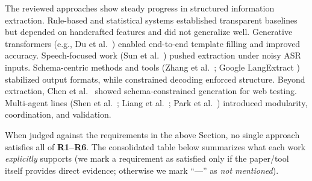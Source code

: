 The reviewed approaches show steady progress in structured information extraction. Rule-based and statistical systems established transparent baselines but depended on handcrafted features and did not generalize well. Generative transformers (e.g., Du et al.\ \cite{du2021template}) enabled end-to-end template filling and improved accuracy. Speech-focused work (Sun et al.\ \cite{sun2023slot}) pushed extraction under noisy ASR inputs. Schema-centric methods and tools (Zhang et al.\ \cite{zhang2023sgptod}; Google LangExtract \cite{google2024langextract}) stabilized output formats, while constrained decoding \cite{anderson2017guided} enforced structure. Beyond extraction, Chen et al.\ \cite{le2025automated} showed schema-constrained generation for web testing. Multi-agent lines (Shen et al.\ \cite{shen2023hugginggpt}; Liang et al.\ \cite{liang2023taskmatrix}; Park et al.\ \cite{park2023generative}) introduced modularity, coordination, and validation. 

When judged against the requirements in the above Section, no single approach satisfies all of \textbf{R1--R6}. The consolidated table below summarizes what each work \emph{explicitly} supports (we mark a requirement as satisfied only if the paper/tool itself provides direct evidence; otherwise we mark ``---'' as \emph{not mentioned}).

